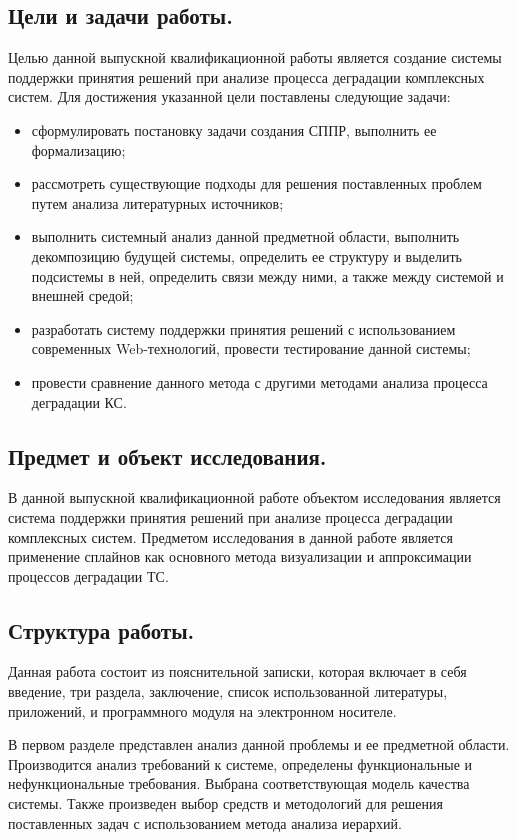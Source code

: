 \subsection{Цели и задачи работы.} 
Целью данной выпускной квалификационной работы является создание системы поддержки принятия решений при анализе процесса деградации комплексных систем.
Для достижения указанной цели поставлены следующие задачи: 
\begin{itemize}
  \item сформулировать постановку задачи создания СППР, выполнить ее формализацию;
  \item рассмотреть существующие подходы для решения поставленных проблем путем анализа литературных источников;
  \item выполнить системный анализ данной предметной области, выполнить декомпозицию будущей системы, определить ее структуру и выделить подсистемы в ней, определить связи между ними, а также между системой и внешней средой;
  \item разработать систему поддержки принятия решений с использованием современных Web-технологий, провести тестирование данной системы;
  \item провести сравнение данного метода с другими методами анализа процесса деградации КС.
\end{itemize}

\subsection{Предмет и объект исследования.}
В данной выпускной квалификационной работе объектом исследования является система поддержки принятия решений при анализе процесса деградации комплексных систем.
Предметом исследования в данной работе является применение сплайнов как основного метода визуализации и аппроксимации процессов деградации ТС.

\subsection{Структура работы.}
Данная работа состоит из пояснительной записки, которая включает в себя введение, три раздела, заключение, список использованной литературы, приложений, и программного модуля на электронном носителе.

В первом разделе представлен анализ данной проблемы и ее предметной области. 
Производится анализ требований к системе, определены функциональные и нефункциональные требования. 
Выбрана соответствующая модель качества системы. 
Также произведен выбор средств и методологий для решения поставленных задач с использованием метода анализа иерархий.

